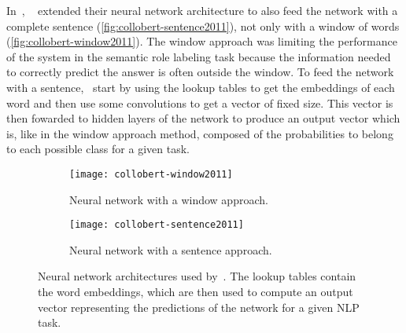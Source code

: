       In~\citeyear{collobert2011natural},
      \citeauthor{collobert2011natural}~\citep{collobert2011natural} extended
      their neural network architecture to also feed the network with a complete
      sentence (\autoref{fig:collobert-sentence2011}), not only with a window of
      words (\autoref{fig:collobert-window2011}). The window approach was
      limiting the performance of the system in the semantic role labeling task
      because the information needed to correctly predict the answer is often
      outside the window. To feed the network with a
      sentence,~\citeauthor{collobert2011natural} start by using the lookup
      tables to get the embeddings of each word and then use some convolutions
      to get a vector of fixed size. This vector is then fowarded to hidden
      layers of the network to produce an output vector which is, like in the
      window approach method, composed of the probabilities to belong to each
      possible class for a given task.

      \begin{figure}[hb]
        \centering
        \begin{subfigure}[t]{0.49\textwidth}
          \centering
          \texttt{[image: collobert-window2011]}
          \caption{Neural network with a window approach.}
          \label{fig:collobert-window2011}
        \end{subfigure} \hfill
        \begin{subfigure}[t]{0.49\textwidth}
          \centering
          \texttt{[image: collobert-sentence2011]}
          \caption{Neural network with a sentence approach.}
          \label{fig:collobert-sentence2011}
        \end{subfigure}
        \caption[Window and sentence approach networks used
        by~\citeauthor{collobert2011natural}]{Neural network architectures used
        by~\citep{collobert2011natural}. The lookup tables contain the word
        embeddings, which are then used to compute an output vector representing
        the predictions of the network for a given NLP task.}
        \label{ch03:fig:collobert2011}
      \end{figure}

